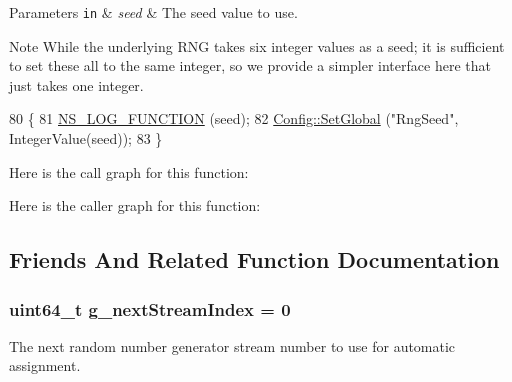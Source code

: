 \begin{DoxyParams}[1]{Parameters}
\mbox{\tt in}  & {\em seed} & The seed value to use.\\
\hline
\end{DoxyParams}
\begin{DoxyNote}{Note}
While the underlying R\+NG takes six integer values as a seed; it is sufficient to set these all to the same integer, so we provide a simpler interface here that just takes one integer. 
\end{DoxyNote}

\begin{DoxyCode}
80 \{
81   \hyperlink{log-macros-disabled_8h_a90b90d5bad1f39cb1b64923ea94c0761}{NS\_LOG\_FUNCTION} (seed);
82   \hyperlink{group__config_ga0e12663a7bd119b65d0a219a578f2a3c}{Config::SetGlobal} (\textcolor{stringliteral}{"RngSeed"}, IntegerValue(seed));
83 \}
\end{DoxyCode}


Here is the call graph for this function\+:




Here is the caller graph for this function\+:




\subsection{Friends And Related Function Documentation}
\subsubsection[{\texorpdfstring{g\+\_\+next\+Stream\+Index}{g_nextStreamIndex}}]{\setlength{\rightskip}{0pt plus 5cm}uint64\+\_\+t g\+\_\+next\+Stream\+Index = 0\hspace{0.3cm}{\ttfamily [related]}}\hypertarget{classns3_1_1RngSeedManager_ae2b9d32369166b9ea617d2d9705db513}{}\label{classns3_1_1RngSeedManager_ae2b9d32369166b9ea617d2d9705db513}
The next random number generator stream number to use for automatic assignment. 
